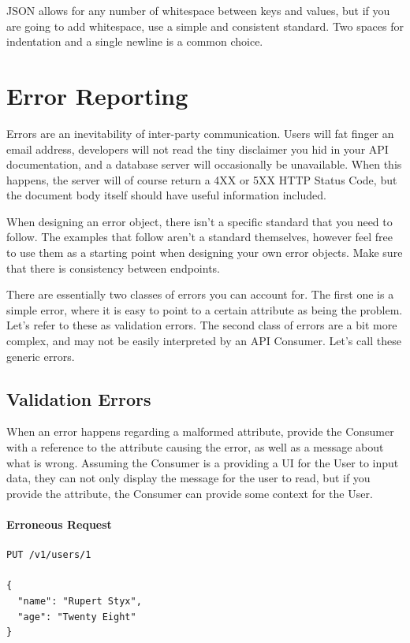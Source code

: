 \documentclass{book}
\begin{document}
JSON allows for any number of whitespace between keys and values, but if you are going to add whitespace, use a simple and consistent standard. Two spaces for indentation and a single newline is a common choice.

\section{Error Reporting}

Errors are an inevitability of inter-party communication. Users will fat finger an email address, developers will not read the tiny disclaimer you hid in your API documentation, and a database server will occasionally be unavailable. When this happens, the server will of course return a 4XX or 5XX HTTP Status Code, but the document body itself should have useful information included.

When designing an error object, there isn't a specific standard that you need to follow. The examples that follow aren't a standard themselves, however feel free to use them as a starting point when designing your own error objects. Make sure that there is consistency between endpoints.

There are essentially two classes of errors you can account for. The first one is a simple error, where it is easy to point to a certain attribute as being the problem. Let's refer to these as validation errors. The second class of errors are a bit more complex, and may not be easily interpreted by an API Consumer. Let's call these generic errors.

\subsection{Validation Errors}

When an error happens regarding a malformed attribute, provide the Consumer with a reference to the attribute causing the error, as well as a message about what is wrong. Assuming the Consumer is a providing a UI for the User to input data, they can not only display the message for the user to read, but if you provide the attribute, the Consumer can provide some context for the User.

\paragraph{\textbf{Erroneous Request}}

\begin{verbatim}
PUT /v1/users/1

{
  "name": "Rupert Styx",
  "age": "Twenty Eight"
}
\end{verbatim}
\end{document}
